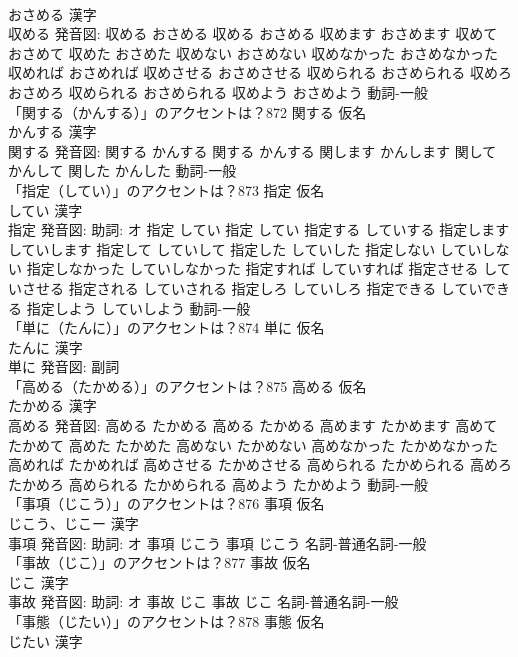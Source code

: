 \documentclass[8pt]{extreport}
\begin{document}
\begin{CJK}{UTF8}{min}
\\	おさめる 漢字　
\\	収める 発音図:	収める おさめる		収める おさめる 収めます おさめます 収めて おさめて 収めた おさめた 収めない おさめない 収めなかった おさめなかった 収めれば おさめれば 収めさせる おさめさせる 収められる おさめられる 収めろ おさめろ 収められる おさめられる 収めよう おさめよう				動詞-一般 
\\	「関する（かんする）」のアクセントは？872	関する 仮名　
\\	かんする 漢字　
\\	関する 発音図:	関する かんする		関する かんする 関します かんします 関して かんして 関した かんした				動詞-一般 
\\	「指定（してい）」のアクセントは？873	指定 仮名　
\\	してい 漢字　
\\	指定 発音図: 助詞: オ	指定 してい		指定 してい 指定する していする 指定します していします 指定して していして 指定した していした 指定しない していしない 指定しなかった していしなかった 指定すれば していすれば 指定させる していさせる 指定される していされる 指定しろ していしろ 指定できる していできる 指定しよう していしよう				動詞-一般 
\\	「単に（たんに）」のアクセントは？874	単に 仮名　
\\	たんに 漢字　
\\	単に 発音図:							副詞 
\\	「高める（たかめる）」のアクセントは？875	高める 仮名　
\\	たかめる 漢字　
\\	高める 発音図:	高める たかめる		高める たかめる 高めます たかめます 高めて たかめて 高めた たかめた 高めない たかめない 高めなかった たかめなかった 高めれば たかめれば 高めさせる たかめさせる 高められる たかめられる 高めろ たかめろ 高められる たかめられる 高めよう たかめよう				動詞-一般 
\\	「事項（じこう）」のアクセントは？876	事項 仮名　
\\	じこう、じこー 漢字　
\\	事項 発音図: 助詞: オ	事項 じこう		事項 じこう				名詞-普通名詞-一般 
\\	「事故（じこ）」のアクセントは？877	事故 仮名　
\\	じこ 漢字　
\\	事故 発音図: 助詞: オ	事故 じこ		事故 じこ				名詞-普通名詞-一般 
\\	「事態（じたい）」のアクセントは？878	事態 仮名　
\\	じたい 漢字　

\end{CJK}
\end{document}
